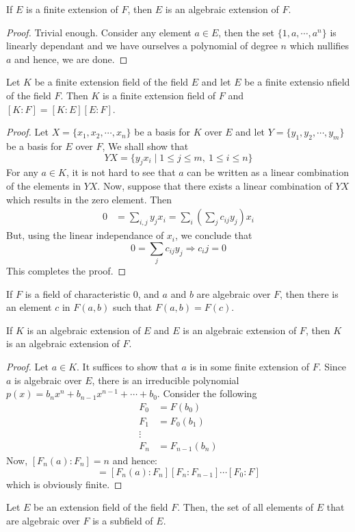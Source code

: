\begin{proposition}
	If $E$ is a finite extension of $F$, then $E$ is an algebraic extension of $F$.
\end{proposition}
\begin{proof}
	Trivial enough. Consider any element $a\in E$, then the set $\{1,a,\cdots,a^n\}$ is linearly dependant and we have ourselves a polynomial of degree $n$ which nullifies $a$ and hence, we are done.
\end{proof}

\begin{proposition}
	Let $K$ be a finite extension field of the field $E$ and let $E$ be a finite extensio nfield of the field $F$. Then $K$ is a finite extension field of $F$ and $[K:F]=[K:E][E:F]$.
\end{proposition}
\begin{proof}
	Let $X=\{x_1,x_2,\cdots,x_n\}$ be a basis for $K$ over $E$ and let $Y=\{y_1,y_2,\cdots,y_m\}$ be a basis for $E$ over $F$, We shall show that 
	\begin{equation*}
		YX = \{y_jx_i\mid 1\le j\le m, ~1\le i\le n\}
	\end{equation*}
	For any $a\in K$, it is not hard to see that $a$ can be written as a linear combination of the elements in $YX$. Now, suppose that there exists a linear combination of $YX$ which results in the zero element. Then
	\begin{align*}
		0 &= \sum_{i,j}y_jx_i = \sum_i\left(\sum_jc_{ij}y_j\right)x_i
	\end{align*}
	But, using the linear independance of $x_i$, we conclude that 
	\begin{equation*}
		0 = \sum_j c_{ij}y_j \Longrightarrow c_ij = 0
	\end{equation*}
	This completes the proof.
\end{proof}

\begin{theorem}[Steinitz, 1910]
	If $F$ is a field of characteristic $0$, and $a$ and $b$ are algebraic over $F$, then there is an element $c$ in $F(a,b)$ such that $F(a,b)=F(c)$.
\end{theorem}

\begin{proposition}
	If $K$ is an algebraic extension of $E$ and $E$ is an algebraic extension of $F$, then $K$ is an algebraic extension of $F$.
\end{proposition}
\begin{proof}
	Let $a\in K$. It suffices to show that $a$ is in some finite extension of $F$. Since $a$ is algebraic over $E$, there is an irreducible polynomial $p(x) = b_nx^n+b_{n-1}x^{n-1}+\cdots+b_0$. Consider the following
	\begin{align*}
		F_0 &= F(b_0)\\
		F_1 &= F_0(b_1)\\
		\vdots\\
		F_n &= F_{n-1}(b_n)
	\end{align*}
	Now, $[F_n(a):F_n]=n$ and hence:
	\begin{equation*}
		[F_n(a):F] = [F_n(a):F_n][F_n:F_{n-1}]\cdots[F_0:F]
	\end{equation*}
	which is obviously finite.
\end{proof}

\begin{corollary}
	Let $E$ be an extension field of the field $F$. Then, the set of all elements of $E$ that are algebraic over $F$ is a subfield of $E$.
\end{corollary}
